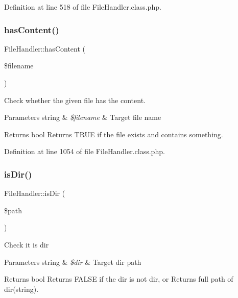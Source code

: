 Definition at line 518 of file File\+Handler.\+class.\+php.

\hypertarget{classFileHandler_ad872016e83b1f62a03d54e359ce31f73}{}\label{classFileHandler_ad872016e83b1f62a03d54e359ce31f73} 
\subsubsection{\texorpdfstring{has\+Content()}{hasContent()}}
{\footnotesize\ttfamily File\+Handler\+::has\+Content (\begin{DoxyParamCaption}\item[{}]{\$filename }\end{DoxyParamCaption})}

Check whether the given file has the content.


\begin{DoxyParams}[1]{Parameters}
string & {\em \$filename} & Target file name \\
\hline
\end{DoxyParams}
\begin{DoxyReturn}{Returns}
bool Returns T\+R\+UE if the file exists and contains something. 
\end{DoxyReturn}


Definition at line 1054 of file File\+Handler.\+class.\+php.

\hypertarget{classFileHandler_a5fd371542d6f1a86269d0b8795e74471}{}\label{classFileHandler_a5fd371542d6f1a86269d0b8795e74471} 
\subsubsection{\texorpdfstring{is\+Dir()}{isDir()}}
{\footnotesize\ttfamily File\+Handler\+::is\+Dir (\begin{DoxyParamCaption}\item[{}]{\$path }\end{DoxyParamCaption})}

Check it is dir


\begin{DoxyParams}[1]{Parameters}
string & {\em \$dir} & Target dir path \\
\hline
\end{DoxyParams}
\begin{DoxyReturn}{Returns}
bool Returns F\+A\+L\+SE if the dir is not dir, or Returns full path of dir(string). 
\end{DoxyReturn}


